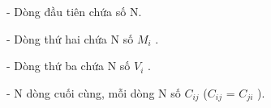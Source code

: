 - Dòng đầu tiên chứa số N.   


   - Dòng thứ hai chứa N số $M_{i}$   .   


   - Dòng thứ ba chứa N số $V_{i}$   .   


   - N dòng cuối cùng, mỗi dòng N số $C_{ij}$   ($C_{ij}$   = $C_{ji}$   ).